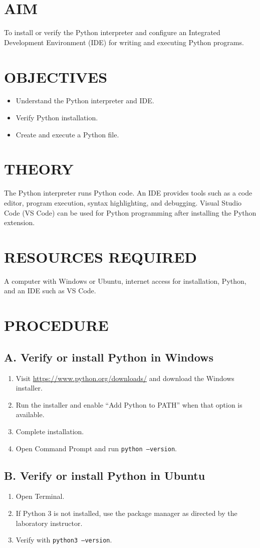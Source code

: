 \documentclass[12pt,a4paper]{report}
\newcommand{\aim}[1]{\section*{AIM}#1}
\begin{document}
\aim{To install or verify the Python interpreter and configure an Integrated Development Environment (IDE) for writing and executing Python programs.}

\section*{OBJECTIVES}
\begin{itemize}
\item Understand the Python interpreter and IDE.
\item Verify Python installation.
\item Create and execute a Python file.
\end{itemize}

\section*{THEORY}
The Python interpreter runs Python code. An IDE provides tools such as a code editor,
program execution, syntax highlighting, and debugging. Visual Studio Code (VS Code)
can be used for Python programming after installing the Python extension.

\section*{RESOURCES REQUIRED}
A computer with Windows or Ubuntu, internet access for installation, Python, and an IDE such as VS Code.

\section*{PROCEDURE}
\subsection*{A. Verify or install Python in Windows}
\begin{enumerate}
\item Visit \url{https://www.python.org/downloads/} and download the Windows installer.
\item Run the installer and enable ``Add Python to PATH'' when that option is available.
\item Complete installation.
\item Open Command Prompt and run \texttt{python --version}.
\end{enumerate}
\subsection*{B. Verify or install Python in Ubuntu}
\begin{enumerate}
\item Open Terminal.
\item If Python 3 is not installed, use the package manager as directed by the laboratory instructor.
\item Verify with \texttt{python3 --version}.
\end{enumerate}
\end{document}
